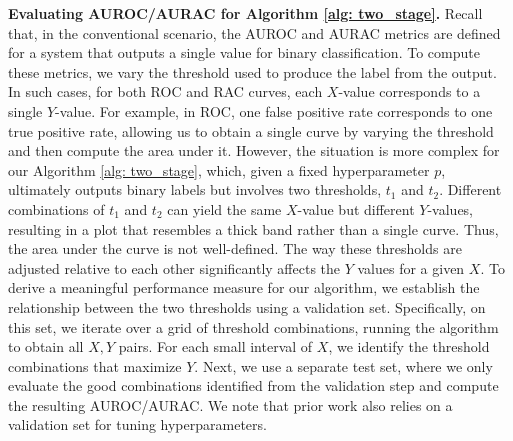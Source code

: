 
\textbf{Evaluating AUROC/AURAC for Algorithm \ref{alg: two_stage}.} Recall that, in the conventional scenario, the AUROC and AURAC metrics are defined for a system that outputs a single value for binary classification. To compute these metrics, we vary the threshold used to produce the label from the output. In such cases, for both ROC and RAC curves, each $X$-value corresponds to a single $Y$-value. For example, in ROC, one false positive rate corresponds to one true positive rate, allowing us to obtain a single curve by varying the threshold and then compute the area under it. However, the situation is more complex for our Algorithm \ref{alg: two_stage}, which, given a fixed hyperparameter $p$, ultimately outputs binary labels but involves two thresholds, $t_1$ and $t_2$. Different combinations of $t_1$ and $t_2$ can yield the same $X$-value but different $Y$-values, resulting in a plot that resembles a thick band rather than a single curve. Thus, the area under the curve is not well-defined. The way these thresholds are adjusted relative to each other significantly affects the $Y$ values for a given $X$. To derive a meaningful performance measure for our algorithm, we establish the relationship between the two thresholds using a validation set. Specifically, on this set, we iterate over a grid of threshold combinations, running the algorithm to obtain all $X,Y$ pairs. For each small interval of $X$, we identify the threshold combinations that maximize $Y$. Next, we use a separate test set, where we only evaluate the good combinations identified from the validation step and compute the resulting AUROC/AURAC. We note that prior work \cite{lin2023generating,nikitin2024kernel} also relies on a validation set for tuning hyperparameters. 

